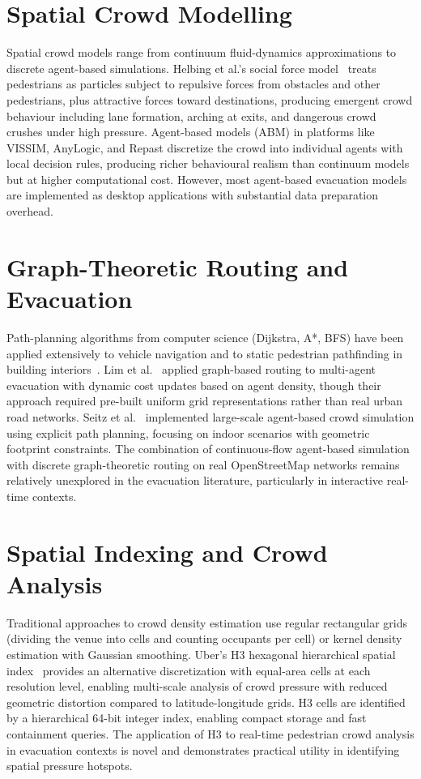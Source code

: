 \documentclass[12pt,a4paper,oneside]{report}
\begin{document}
\section{Spatial Crowd Modelling}
Spatial crowd models range from continuum fluid-dynamics approximations to discrete agent-based simulations. Helbing et al.'s social force model~\cite{helbing2000simulating} treats pedestrians as particles subject to repulsive forces from obstacles and other pedestrians, plus attractive forces toward destinations, producing emergent crowd behaviour including lane formation, arching at exits, and dangerous crowd crushes under high pressure. Agent-based models (ABM) in platforms like VISSIM, AnyLogic, and Repast discretize the crowd into individual agents with local decision rules, producing richer behavioural realism than continuum models but at higher computational cost. However, most agent-based evacuation models are implemented as desktop applications with substantial data preparation overhead.

\section{Graph-Theoretic Routing and Evacuation}
Path-planning algorithms from computer science (Dijkstra, A*, BFS) have been applied extensively to vehicle navigation and to static pedestrian pathfinding in building interiors~\cite{hart1968formal, dijkstra1959shortest}. Lim et al.~\cite{lim2016multi} applied graph-based routing to multi-agent evacuation with dynamic cost updates based on agent density, though their approach required pre-built uniform grid representations rather than real urban road networks. Seitz et al.~\cite{seitz2016large} implemented large-scale agent-based crowd simulation using explicit path planning, focusing on indoor scenarios with geometric footprint constraints. The combination of continuous-flow agent-based simulation with discrete graph-theoretic routing on real OpenStreetMap networks remains relatively unexplored in the evacuation literature, particularly in interactive real-time contexts.

\section{Spatial Indexing and Crowd Analysis}
Traditional approaches to crowd density estimation use regular rectangular grids (dividing the venue into cells and counting occupants per cell) or kernel density estimation with Gaussian smoothing. Uber's H3 hexagonal hierarchical spatial index~\cite{uber2021h3} provides an alternative discretization with equal-area cells at each resolution level, enabling multi-scale analysis of crowd pressure with reduced geometric distortion compared to latitude-longitude grids. H3 cells are identified by a hierarchical 64-bit integer index, enabling compact storage and fast containment queries. The application of H3 to real-time pedestrian crowd analysis in evacuation contexts is novel and demonstrates practical utility in identifying spatial pressure hotspots.
\end{document}
